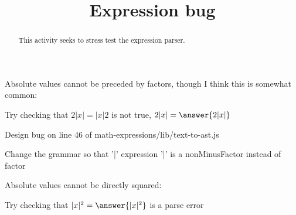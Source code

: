 \documentclass[handout]{ximera}
\title{Expression bug}
\begin{document}
\begin{abstract} This activity seeks to stress test the expression parser.
\end{abstract}


\maketitle

\begin{problem}
Absolute values cannot be preceded by factors, though I think this is somewhat common:

Try checking that $ 2|x| = |x|2$ is not true, $ 2|x| = \answer{2|x|}$

Design bug on line 46 of math-expressions/lib/text-to-ast.js

Change the grammar so that '|' expression '|' is a nonMinusFactor instead of factor
\end{problem}

\begin{problem}
Absolute values cannot be directly squared:

Try checking that $|x|^2 = \answer{|x|^2}$ is a parse error
\end{problem}
\end{document}
